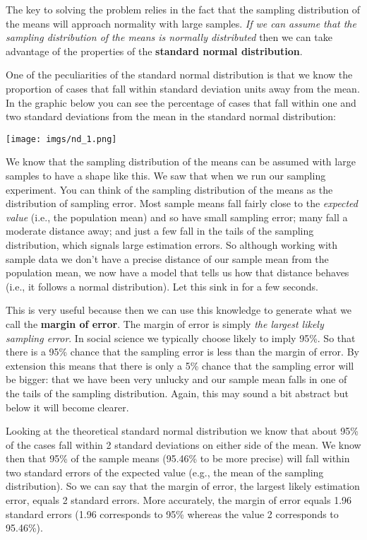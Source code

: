 \documentclass[
]{book}
\begin{document}
The key to solving the problem relies in the fact that the sampling distribution of the means will approach normality with large samples. \emph{If we can assume that the sampling distribution of the means is normally distributed} then we can take advantage of the properties of the \textbf{standard normal distribution}.

One of the peculiarities of the standard normal distribution is that we know the proportion of cases that fall within standard deviation units away from the mean. In the graphic below you can see the percentage of cases that fall within one and two standard deviations from the mean in the standard normal distribution:

\texttt{[image: imgs/nd\_1.png]}

We know that the sampling distribution of the means can be assumed with large samples to have a shape like this. We saw that when we run our sampling experiment. You can think of the sampling distribution of the means as the distribution of sampling error. Most sample means fall fairly close to the \emph{expected value} (i.e., the population mean) and so have small sampling error; many fall a moderate distance away; and just a few fall in the tails of the sampling distribution, which signals large estimation errors. So although working with sample data we don't have a precise distance of our sample mean from the population mean, we now have a model that tells us how that distance behaves (i.e., it follows a normal distribution). Let this sink in for a few seconds.

This is very useful because then we can use this knowledge to generate what we call the \textbf{margin of error}. The margin of error is simply \emph{the largest likely sampling error}. In social science we typically choose likely to imply 95\%. So that there is a 95\% chance that the sampling error is less than the margin of error. By extension this means that there is only a 5\% chance that the sampling error will be bigger: that we have been very unlucky and our sample mean falls in one of the tails of the sampling distribution. Again, this may sound a bit abstract but below it will become clearer.

Looking at the theoretical standard normal distribution we know that about 95\% of the cases fall within 2 standard deviations on either side of the mean. We know then that 95\% of the sample means (95.46\% to be more precise) will fall within two standard errors of the expected value (e.g., the mean of the sampling distribution). So we can say that the margin of error, the largest likely estimation error, equals 2 standard errors. More accurately, the margin of error equals 1.96 standard errors (1.96 corresponds to 95\% whereas the value 2 corresponds to 95.46\%).
\end{document}
